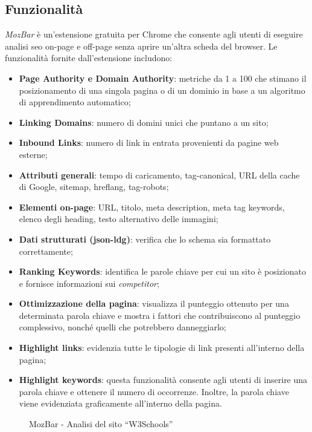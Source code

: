 \subsection{Funzionalità}
\par \textit{MozBar} è un'estensione gratuita per Chrome che consente agli utenti di eseguire analisi \gls{seo} \gls{on-page} e \gls{off-page} senza aprire un'altra scheda del browser. Le funzionalità fornite dall'estensione includono:
\begin{itemize}
    \item \textbf{Page Authority e Domain Authority}: metriche da 1 a 100 che stimano il posizionamento di una singola pagina o di un dominio in base a un algoritmo di apprendimento automatico;
    \item \textbf{Linking Domains}: numero di domini unici che puntano a un sito;
    \item \textbf{Inbound Links}: numero di link in entrata provenienti da pagine web esterne;
    \item \textbf{Attributi generali}: tempo di caricamento, \gls{tag-canonical}, URL della cache di Google, \gls{sitemap}, \gls{hreflang}, \gls{tag-robots};
    \item \textbf{Elementi on-page}: URL, titolo, meta description, meta tag keywords, elenco degli heading, testo alternativo delle immagini;
    \item \textbf{Dati strutturati (\gls{json-ldg})}: verifica che lo schema sia formattato correttamente;
    \item \textbf{Ranking Keywords}: identifica le parole chiave per cui un sito è posizionato e fornisce informazioni sui \textit{competitor};
    \item \textbf{Ottimizzazione della pagina}: visualizza il punteggio ottenuto per una determinata parola chiave e mostra  i fattori che contribuiscono al punteggio complessivo, nonché quelli che potrebbero danneggiarlo;
    \item \textbf{Highlight links}: evidenzia tutte le tipologie di link presenti all'interno della pagina;
    \item \textbf{Highlight keywords}: questa funzionalità consente agli utenti di inserire una parola chiave e ottenere il numero di occorrenze. Inoltre, la parola chiave viene evidenziata graficamente all'interno della pagina.
\end{itemize}

\begin{figure}[H]
    \centering 
    \caption{MozBar - Analisi del sito “W3Schools”}
\end{figure}

